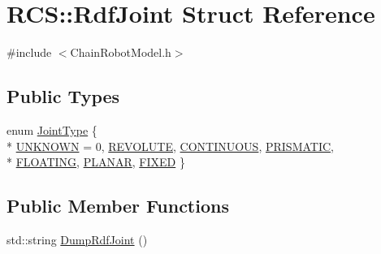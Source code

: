 \hypertarget{structRCS_1_1RdfJoint}{\section{R\-C\-S\-:\-:Rdf\-Joint Struct Reference}
\label{structRCS_1_1RdfJoint}
}


{\ttfamily \#include $<$Chain\-Robot\-Model.\-h$>$}

\subsection*{Public Types}
\begin{DoxyCompactItemize}
\item 
enum \hyperlink{structRCS_1_1RdfJoint_a95b90d76b64454c209ab4b7901dbb09d}{Joint\-Type} \{ \\*
\hyperlink{structRCS_1_1RdfJoint_a95b90d76b64454c209ab4b7901dbb09daf2e0413884f5a58c165886f7821bb68e}{U\-N\-K\-N\-O\-W\-N} = 0, 
\hyperlink{structRCS_1_1RdfJoint_a95b90d76b64454c209ab4b7901dbb09daa9a5429627c95fb4af8f445cff4ddde6}{R\-E\-V\-O\-L\-U\-T\-E}, 
\hyperlink{structRCS_1_1RdfJoint_a95b90d76b64454c209ab4b7901dbb09da1dfb801ba2337309a9ab58520501a048}{C\-O\-N\-T\-I\-N\-U\-O\-U\-S}, 
\hyperlink{structRCS_1_1RdfJoint_a95b90d76b64454c209ab4b7901dbb09da66d285590c69e3d23a62d10d7575fc3f}{P\-R\-I\-S\-M\-A\-T\-I\-C}, 
\\*
\hyperlink{structRCS_1_1RdfJoint_a95b90d76b64454c209ab4b7901dbb09da395688d6fa2818ee1f4615b11f9f69b1}{F\-L\-O\-A\-T\-I\-N\-G}, 
\hyperlink{structRCS_1_1RdfJoint_a95b90d76b64454c209ab4b7901dbb09da3dc390004f1f1b05f8924e99700ea518}{P\-L\-A\-N\-A\-R}, 
\hyperlink{structRCS_1_1RdfJoint_a95b90d76b64454c209ab4b7901dbb09da56ab3e21cdeea8719449c1c2cf178628}{F\-I\-X\-E\-D}
 \}
\end{DoxyCompactItemize}
\subsection*{Public Member Functions}
\begin{DoxyCompactItemize}
\item 
std\-::string \hyperlink{structRCS_1_1RdfJoint_a99183074db6e994e2df9863c45c979ad}{Dump\-Rdf\-Joint} ()
\end{DoxyCompactItemize}
